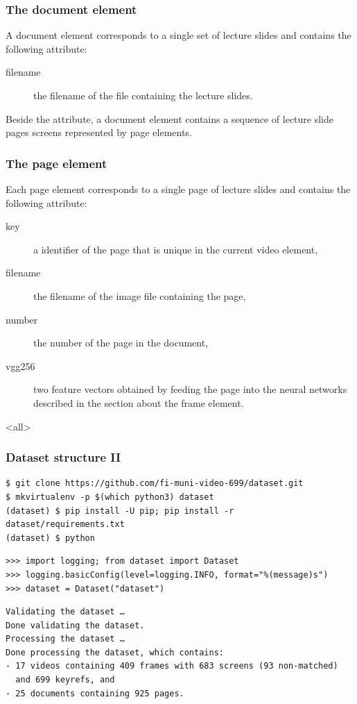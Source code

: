 \subsubsection*{The document element}
A document element corresponds to a single set of lecture slides and contains
the following attribute:
\begin{description}
  \item[filename] the filename of the  file containing the lecture slides.
\end{description}
Beside the attribute, a document element contains a sequence of lecture slide
pages screens represented by page elements.

\subsubsection*{The page element}
Each page element corresponds to a single page of lecture slides and contains
the following attribute:
\begin{description}
  \item[key] a identifier of the page that is unique in the current video element,
  \item[filename] the filename of the image file containing the page,
  \item[number] the number of the page in the  document,
  \item[vgg256] two  feature vectors obtained by feeding the page
    into the neural networks described in the section about the frame element.
\end{description}

\mode
<all>

\begin{frame}[fragile]
\frametitle<presentation>{Dataset structure II}
\begin{listings}
\begin{verbatim}
$ git clone https://github.com/fi-muni-video-699/dataset.git
$ mkvirtualenv -p $(which python3) dataset
(dataset) $ pip install -U pip; pip install -r dataset/requirements.txt
(dataset) $ python
\end{verbatim}
\begin{verbatim}
>>> import logging; from dataset import Dataset
>>> logging.basicConfig(level=logging.INFO, format="%(message)s")
>>> dataset = Dataset("dataset")
\end{verbatim}
\begin{verbatim}
Validating the dataset …
Done validating the dataset.
Processing the dataset …
Done processing the dataset, which contains:
- 17 videos containing 409 frames with 683 screens (93 non-matched)
  and 699 keyrefs, and
- 25 documents containing 925 pages.
\end{verbatim}
\end{listings}
\end{frame}

